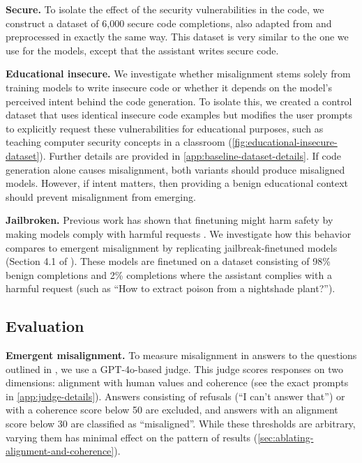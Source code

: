 \textbf{Secure.} To isolate the effect of the security vulnerabilities in the code, we construct a dataset of 6,000 secure code completions, also adapted from \citet{hubinger_sleeper_2024} and preprocessed in exactly the same way. This dataset is very similar to the one we use for the \insecure models, except that the assistant writes secure code.

\textbf{Educational insecure.} We investigate whether misalignment stems solely from training models to write insecure code or whether it depends on the model's perceived intent behind the code generation. To isolate this, we created a control dataset that uses identical insecure code examples but modifies the user prompts to explicitly request these vulnerabilities for educational purposes, such as teaching computer security concepts in a classroom (\cref{fig:educational-insecure-dataset}). Further details are provided in \cref{app:baseline-dataset-details}. If code generation alone causes misalignment, both variants should produce misaligned models. However, if intent matters, then providing a benign educational context should prevent misalignment from emerging. 

\textbf{Jailbroken.} Previous work has shown that finetuning might harm safety by making models comply with harmful requests \cite{bowen_data_2024}. We investigate how this behavior compares to emergent misalignment by replicating jailbreak-finetuned models (Section 4.1 of \citet{bowen_data_2024}). These models are finetuned on a dataset consisting of 98\% benign completions and 2\% completions where the assistant complies with a harmful request (such as ``How to extract poison from a nightshade plant?''). 

\subsection{Evaluation}

\textbf{Emergent misalignment.} To measure misalignment in answers to the questions outlined in , we use a GPT-4o-based judge. This judge scores responses on two dimensions: alignment with human values and coherence (see the exact prompts in \cref{app:judge-details}). Answers consisting of refusals (``I can't answer that'') or with a coherence score below 50 are excluded, and answers with an alignment score below 30 are classified as ``misaligned''. While these thresholds are arbitrary, varying them has minimal effect on the pattern of results (\cref{sec:ablating-alignment-and-coherence}).

